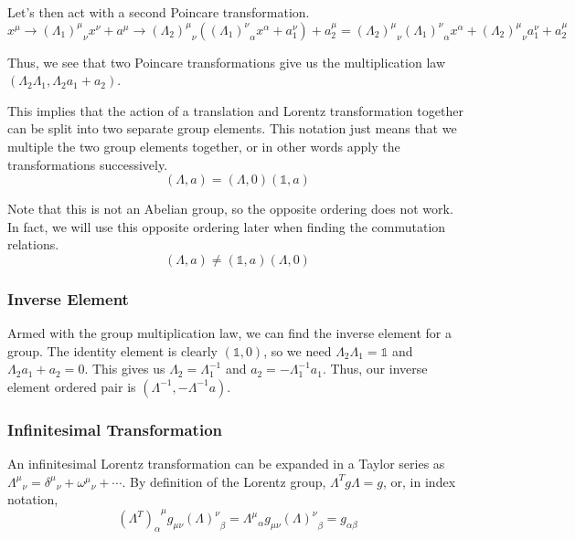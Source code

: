 \documentclass[12pt]{article}
\begin{document}
Let's then act with a second Poincare transformation.
\begin{equation}
    x^\mu \rightarrow {(\Lambda_1)^\mu}_\nu x^\nu + a^\mu \rightarrow {(\Lambda_2)^\mu}_\nu({(\Lambda_1)^\nu}_\alpha x^\alpha + a_1^\nu) + a_2^\mu = {(\Lambda_2)^\mu}_\nu{(\Lambda_1)^\nu}_\alpha x^\alpha+{(\Lambda_2)^\mu}_\nu a_1^\nu + a_2^\mu
\end{equation}

Thus, we see that two Poincare transformations give us the multiplication law $(\Lambda_2\Lambda_1,\Lambda_2 a_1 + a_2)$.

This implies that the action of a translation and Lorentz transformation together can be split into two separate group elements. This notation just means that we multiple the two group elements together, or in other words apply the transformations successively.
\begin{equation}
    (\Lambda,a)=(\Lambda,0)(\mathbb{1},a)
\end{equation}

Note that this is not an Abelian group, so the opposite ordering does not work. In fact, we will use this opposite ordering later when finding the commutation relations.
\begin{equation}
    (\Lambda,a)\neq (\mathbb{1},a)(\Lambda,0)
\end{equation}

\subsubsection{Inverse Element}
Armed with the group multiplication law, we can find the inverse element for a group. The identity element is clearly $(\mathbb{1}, 0)$, so we need $\Lambda_2\Lambda_1=\mathbb{1}$ and $\Lambda_2a_1+a_2=0$. This gives us $\Lambda_2=\Lambda_1^{-1}$ and $a_2=-\Lambda_1^{-1}a_1$. Thus, our inverse element ordered pair is $(\Lambda^{-1},-\Lambda^{-1}a)$.

\subsubsection{Infinitesimal Transformation}
An infinitesimal Lorentz transformation can be expanded in a Taylor series as ${\Lambda^\mu}_\nu={\delta^\mu}_\nu+{\omega^\mu}_\nu+\cdots$. By definition of the Lorentz group, $\Lambda^Tg\Lambda=g$, or, in index notation,
\begin{equation}
    {(\Lambda^T)_\alpha}^\mu g_{\mu\nu} {(\Lambda)^\nu}_\beta={\Lambda^\mu}_\alpha g_{\mu\nu} {(\Lambda)^\nu}_\beta=g_{\alpha\beta}
\end{equation}
\end{document}

